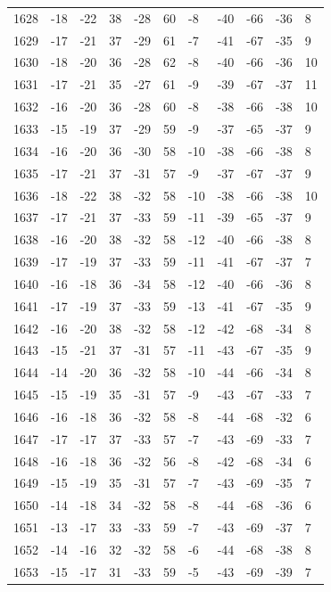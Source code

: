 \begin{table}[H]
\begin{tabular}{lllllllllll}
1628 & -18 & -22 & 38 & -28 & 60 & -8 & -40 & -66 & -36 & 8 \\
1629 & -17 & -21 & 37 & -29 & 61 & -7 & -41 & -67 & -35 & 9 \\
1630 & -18 & -20 & 36 & -28 & 62 & -8 & -40 & -66 & -36 & 10 \\
1631 & -17 & -21 & 35 & -27 & 61 & -9 & -39 & -67 & -37 & 11 \\
1632 & -16 & -20 & 36 & -28 & 60 & -8 & -38 & -66 & -38 & 10 \\
1633 & -15 & -19 & 37 & -29 & 59 & -9 & -37 & -65 & -37 & 9 \\
1634 & -16 & -20 & 36 & -30 & 58 & -10 & -38 & -66 & -38 & 8 \\
1635 & -17 & -21 & 37 & -31 & 57 & -9 & -37 & -67 & -37 & 9 \\
1636 & -18 & -22 & 38 & -32 & 58 & -10 & -38 & -66 & -38 & 10 \\
1637 & -17 & -21 & 37 & -33 & 59 & -11 & -39 & -65 & -37 & 9 \\
1638 & -16 & -20 & 38 & -32 & 58 & -12 & -40 & -66 & -38 & 8 \\
1639 & -17 & -19 & 37 & -33 & 59 & -11 & -41 & -67 & -37 & 7 \\
1640 & -16 & -18 & 36 & -34 & 58 & -12 & -40 & -66 & -36 & 8 \\
1641 & -17 & -19 & 37 & -33 & 59 & -13 & -41 & -67 & -35 & 9 \\
1642 & -16 & -20 & 38 & -32 & 58 & -12 & -42 & -68 & -34 & 8 \\
1643 & -15 & -21 & 37 & -31 & 57 & -11 & -43 & -67 & -35 & 9 \\
1644 & -14 & -20 & 36 & -32 & 58 & -10 & -44 & -66 & -34 & 8 \\
1645 & -15 & -19 & 35 & -31 & 57 & -9 & -43 & -67 & -33 & 7 \\
1646 & -16 & -18 & 36 & -32 & 58 & -8 & -44 & -68 & -32 & 6 \\
1647 & -17 & -17 & 37 & -33 & 57 & -7 & -43 & -69 & -33 & 7 \\
1648 & -16 & -18 & 36 & -32 & 56 & -8 & -42 & -68 & -34 & 6 \\
1649 & -15 & -19 & 35 & -31 & 57 & -7 & -43 & -69 & -35 & 7 \\
1650 & -14 & -18 & 34 & -32 & 58 & -8 & -44 & -68 & -36 & 6 \\
1651 & -13 & -17 & 33 & -33 & 59 & -7 & -43 & -69 & -37 & 7 \\
1652 & -14 & -16 & 32 & -32 & 58 & -6 & -44 & -68 & -38 & 8 \\
1653 & -15 & -17 & 31 & -33 & 59 & -5 & -43 & -69 & -39 & 7 \\

\end{tabular}
\end{table}
